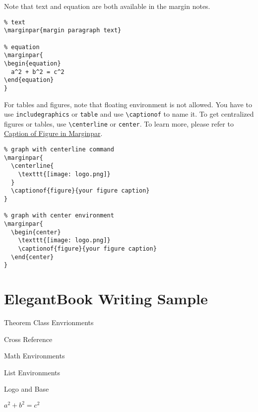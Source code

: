 \documentclass[11pt]{elegantbook}
\begin{document}
\begin{remark}
Note that text and equation are both available in the margin notes.
\begin{lstlisting}
% text
\marginpar{margin paragraph text}

% equation
\marginpar{
\begin{equation}
  a^2 + b^2 = c^2
\end{equation}
}
\end{lstlisting}

For tables and figures, note that floating environment is not allowed. You have to use \lstinline{includegraphics} or \lstinline{table} and use \lstinline{\captionof} to name it. To get centralized figures or tables, use \lstinline{\centerline} or \lstinline{center}. To learn more, please refer to \href{https://tex.stackexchange.com/questions/5583/caption-of-figure-in-marginpar-and-caption-of-wrapfigure-in-margin}{Caption of Figure in Marginpar}.

\begin{lstlisting}
% graph with centerline command
\marginpar{
  \centerline{
    \texttt{[image: logo.png]}
  }
  \captionof{figure}{your figure caption}
}

% graph with center environment
\marginpar{
  \begin{center}
    \texttt{[image: logo.png]}
    \captionof{figure}{your figure caption}
  \end{center}
}
\end{lstlisting}

\end{remark}



\chapter{ElegantBook Writing Sample}

\begin{introduction}
\item Theorem Class Envrionments
\item Cross Reference
\item Math Environments
\item List Environments
\item Logo and Base 
\item $a^2+b^2=c^2$
\end{introduction}


\lipsum[1]
\end{document}
